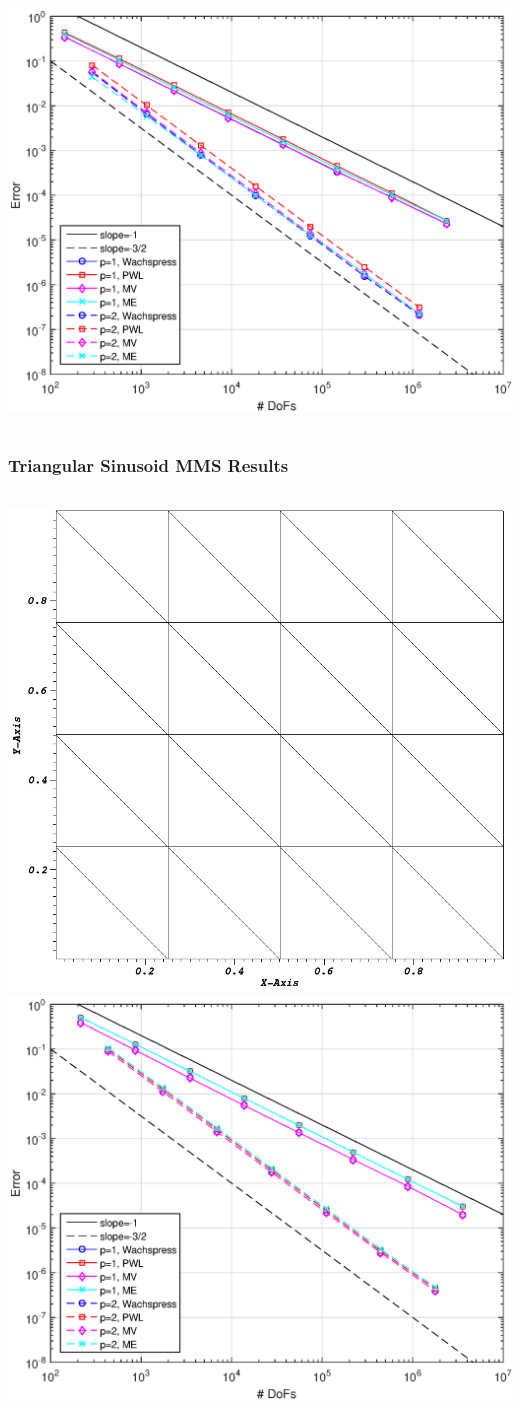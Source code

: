 \documentclass[compress,10pt]{beamer}
\begin{document}
\begin{frame}[t]
{\begin{columns}
{}\includegraphics[width=0.9\columnwidth]{images/TransMMS_Sine_cart_err.eps}
\end{columns}
}
{
\frametitle{Triangular Sinusoid MMS Results}
\vspace{1.5cm}
\begin{columns}
{}\includegraphics[width=0.8\columnwidth]{images/tri_mesh.jpg}
{}\includegraphics[width=0.9\columnwidth]{images/TransMMS_Sine_tri_err.eps}

\end{columns}}
\end{frame}
\end{document}
